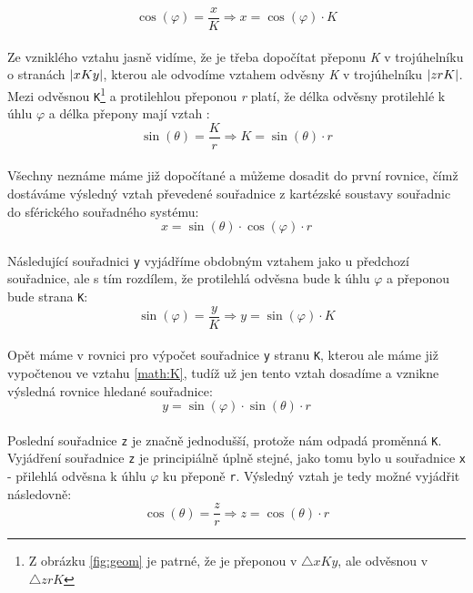 \begin{equation}
 \cos (\varphi) = \frac{x}{K}  \Rightarrow x = \cos (\varphi) \cdot K
\end{equation}
\\
Ze vzniklého vztahu jasně vidíme, že je třeba dopočítat přeponu \textit{K} v trojúhelníku  o stranách $\arrowvert xKy\arrowvert$, kterou ale odvodíme vztahem odvěsny \textit{K} v trojúhelníku $\arrowvert zrK\arrowvert$. Mezi odvěsnou \texttt{K}\footnote{Z obrázku \ref{fig:geom} je patrné, že je přeponou v $\bigtriangleup xKy$, ale odvěsnou v $\bigtriangleup zrK$} a protilehlou přeponou \textit{r} platí, že délka odvěsny protilehlé k úhlu $\varphi$ a délka přepony mají vztah \cite{Goniometrie}:
\\
\begin{equation}
\label{math:K}
\sin (\theta) = \frac{K}{r}  \Rightarrow K = \sin (\theta) \cdot r
\end{equation}
\\
Všechny neznáme máme již dopočítané a můžeme dosadit do první rovnice, čímž dostáváme výsledný vztah převedené souřadnice z kartézské soustavy souřadnic do sférického souřadného systému:
\\
\begin{equation}
\label{math:x}
x = \sin (\theta) \cdot  \cos (\varphi) \cdot r
\end{equation}
\\
Následující souřadnici \texttt{y} vyjádříme obdobným vztahem jako u předchozí souřadnice, ale s tím rozdílem, že protilehlá odvěsna bude k úhlu $\varphi$ a přeponou bude strana \texttt{K}:
\\
\begin{displaymath}
\sin (\varphi) = \frac{y}{K}  \Rightarrow y = \sin (\varphi) \cdot K
\end{displaymath}
\\
Opět máme v rovnici pro výpočet souřadnice \texttt{y} stranu \texttt{K}, kterou ale máme již vypočtenou ve vztahu \ref{math:K}, tudíž už jen tento vztah dosadíme a vznikne výsledná rovnice hledané  souřadnice:
\\
\begin{equation}
\label{math:y}
y = \sin (\varphi) \cdot \sin (\theta) \cdot r
\end{equation}
\\
Poslední souřadnice \texttt{z} je značně jednodušší, protože nám odpadá proměnná \texttt{K}. Vyjádření souřadnice \texttt{z} je principiálně úplně stejné, jako tomu bylo u souřadnice \texttt{x} - přilehlá odvěsna k úhlu $\varphi$ ku přeponě \texttt{r}. Výsledný vztah je tedy možné vyjádřit následovně:
\\
\begin{equation}
\label{math:z}
\cos (\theta) = \frac{z}{r} \Rightarrow z = \cos (\theta) \cdot r
\end{equation}


